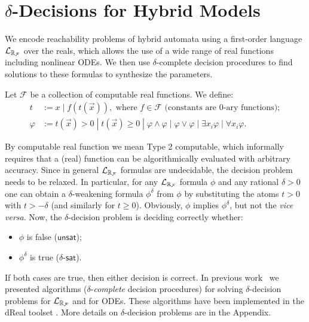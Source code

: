 \section{$\delta$-Decisions for Hybrid Models}
We encode reachability problems of hybrid automata using a first-order language $\mathcal{L}_{\mathbb{R}_{\mathcal{F}}}$ over the reals, 
which allows the use of a wide range of real functions including nonlinear ODEs. 
We then use $\delta$-complete decision procedures to find solutions to these formulas to synthesize 
the parameters. 

\begin{definition}
Let $\mathcal{F}$ be a collection of computable real functions. We define:
\begin{align*}
t& := x \; | \; f(t(\vec x)), \mbox{ where }f\in \mathcal{F} \mbox{ (constants are 0-ary functions)};\\
\varphi& := t(\vec x)> 0 \; | \; t(\vec x)\geq 0 \; | \; \varphi\wedge\varphi
\; | \; \varphi\vee\varphi \; | \; \exists x_i\varphi \; |\; \forall x_i\varphi.
\end{align*}
\end{definition}
By computable real function we mean Type 2 computable, which informally requires that a (real) 
function can be algorithmically evaluated with arbitrary accuracy. Since in general 
$\mathcal{L}_{\mathbb{R}_{\mathcal{F}}}$ formulas are undecidable, the decision problem needs to be relaxed. In particular, for 
any $\mathcal{L}_{\mathbb{R}_{\mathcal{F}}}$ formula $\phi$ and any rational $\delta >0$ one can obtain a $\delta$-weakening 
formula $\phi^\delta$ from $\phi$ by substituting the atoms $t > 0$ with $t > -\delta$ (and
similarly for $t \geq 0$). Obviously, $\phi$ implies $\phi^\delta$, but not the {\em vice versa}.
Now, the $\delta$-decision problem is deciding correctly whether:
\begin{itemize}
	\item $\phi$ is false ($\mathsf{unsat}$);
	\item $\phi^\delta$ is true ($\delta$-$\mathsf{sat}$).
\end{itemize}
If both cases are true, then either decision is correct. In previous work~\cite{gao12a,gao12b,gao13}
we presented algorithms ($\delta$-{\em complete} decision procedures) for solving $\delta$-decision 
problems for $\mathcal{L}_{\mathbb{R}_{\mathcal{F}}}$ and for ODEs. These algorithms have been implemented in the dReal 
toolset \cite{dreal}. More details on $\delta$-decision problems are in the Appendix. 

